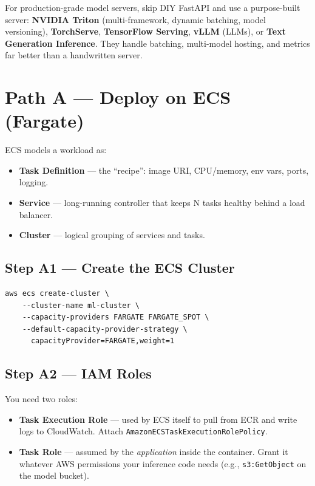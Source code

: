 \documentclass[11pt,a4paper]{article}
\begin{document}
\begin{tipbox}
For production-grade model servers, skip DIY FastAPI and use a purpose-built
server: \textbf{NVIDIA Triton} (multi-framework, dynamic batching, model
versioning), \textbf{TorchServe}, \textbf{TensorFlow Serving},
\textbf{vLLM} (LLMs), or \textbf{Text Generation Inference}. They handle batching,
multi-model hosting, and metrics far better than a handwritten server.
\end{tipbox}

\section{Path A --- Deploy on ECS (Fargate)}

ECS models a workload as:

\begin{itemize}[leftmargin=*,nosep]
    \item \textbf{Task Definition} --- the ``recipe'': image URI, CPU/memory,
          env vars, ports, logging.
    \item \textbf{Service} --- long-running controller that keeps N tasks
          healthy behind a load balancer.
    \item \textbf{Cluster} --- logical grouping of services and tasks.
\end{itemize}

\subsection{Step A1 --- Create the ECS Cluster}

\begin{lstlisting}[style=bashcode]
aws ecs create-cluster \
    --cluster-name ml-cluster \
    --capacity-providers FARGATE FARGATE_SPOT \
    --default-capacity-provider-strategy \
      capacityProvider=FARGATE,weight=1
\end{lstlisting}

\subsection{Step A2 --- IAM Roles}

You need two roles:

\begin{itemize}[leftmargin=*,nosep]
    \item \textbf{Task Execution Role} --- used by ECS itself to pull from ECR
          and write logs to CloudWatch. Attach
          \texttt{AmazonECSTaskExecutionRolePolicy}.
    \item \textbf{Task Role} --- assumed by the \emph{application} inside the
          container. Grant it whatever AWS permissions your inference code
          needs (e.g., \texttt{s3:GetObject} on the model bucket).
\end{itemize}
\end{document}
